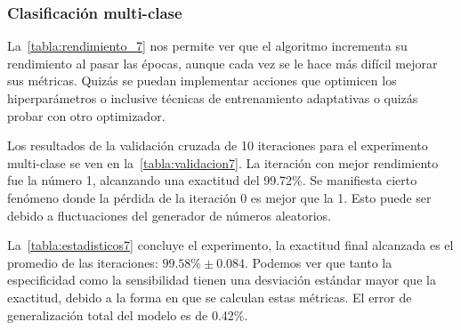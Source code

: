 \subsubsection{Clasificación multi-clase}

La~\autoref{tabla:rendimiento_7} nos permite ver que el algoritmo incrementa su
rendimiento al pasar las épocas, aunque cada vez se le hace más difícil mejorar
sus métricas. Quizás se puedan implementar acciones que optimicen los
hiperparámetros o inclusive técnicas de entrenamiento adaptativas o quizás
probar con otro optimizador.

Los resultados de la validación cruzada de 10 iteraciones para el experimento
multi-clase se ven en la~\autoref{tabla:validacion7}. La iteración con mejor
rendimiento fue la número 1, alcanzando una exactitud del 99.72\%. Se manifiesta
cierto fenómeno donde la pérdida de la iteración 0 es mejor que la 1. Esto puede
ser debido a fluctuaciones del generador de números aleatorios.

\begin{table}[H]
    \centering
    \caption{Resultados de la validación cruzada multi-clase}\label{tabla:validacion7}
    \end{table}

La~\autoref{tabla:estadisticos7} concluye el experimento, la exactitud final
alcanzada es el promedio de las iteraciones: \(99.58\% \pm 0.084\). Podemos ver
que tanto la especificidad como la sensibilidad tienen una desviación estándar
mayor que la exactitud, debido a la forma en que se calculan estas métricas. El
error de generalización total del modelo es de 0.42\%.


